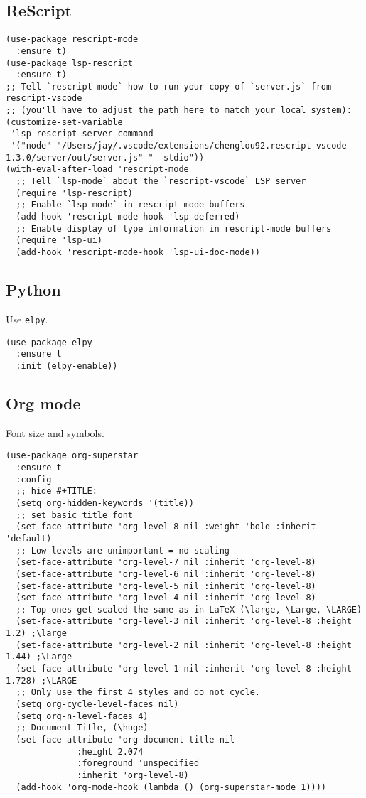 \documentclass[a4paper,11pt]{article}
\begin{document}
\subsection{ReScript}
\label{sec:org5b76676}
\begin{verbatim}
(use-package rescript-mode
  :ensure t)
(use-package lsp-rescript
  :ensure t)
;; Tell `rescript-mode` how to run your copy of `server.js` from rescript-vscode
;; (you'll have to adjust the path here to match your local system):
(customize-set-variable
 'lsp-rescript-server-command
 '("node" "/Users/jay/.vscode/extensions/chenglou92.rescript-vscode-1.3.0/server/out/server.js" "--stdio"))
(with-eval-after-load 'rescript-mode
  ;; Tell `lsp-mode` about the `rescript-vscode` LSP server
  (require 'lsp-rescript)
  ;; Enable `lsp-mode` in rescript-mode buffers
  (add-hook 'rescript-mode-hook 'lsp-deferred)
  ;; Enable display of type information in rescript-mode buffers
  (require 'lsp-ui)
  (add-hook 'rescript-mode-hook 'lsp-ui-doc-mode))
\end{verbatim}

\subsection{Python}
\label{sec:org11dc5ef}
Use \texttt{elpy}.
\begin{verbatim}
(use-package elpy
  :ensure t
  :init (elpy-enable))
\end{verbatim}

\subsection{Org mode}
\label{sec:orgc0129a2}
Font size and symbols.
\begin{verbatim}
(use-package org-superstar
  :ensure t
  :config
  ;; hide #+TITLE:
  (setq org-hidden-keywords '(title))
  ;; set basic title font
  (set-face-attribute 'org-level-8 nil :weight 'bold :inherit 'default)
  ;; Low levels are unimportant = no scaling
  (set-face-attribute 'org-level-7 nil :inherit 'org-level-8)
  (set-face-attribute 'org-level-6 nil :inherit 'org-level-8)
  (set-face-attribute 'org-level-5 nil :inherit 'org-level-8)
  (set-face-attribute 'org-level-4 nil :inherit 'org-level-8)
  ;; Top ones get scaled the same as in LaTeX (\large, \Large, \LARGE)
  (set-face-attribute 'org-level-3 nil :inherit 'org-level-8 :height 1.2) ;\large
  (set-face-attribute 'org-level-2 nil :inherit 'org-level-8 :height 1.44) ;\Large
  (set-face-attribute 'org-level-1 nil :inherit 'org-level-8 :height 1.728) ;\LARGE
  ;; Only use the first 4 styles and do not cycle.
  (setq org-cycle-level-faces nil)
  (setq org-n-level-faces 4)
  ;; Document Title, (\huge)
  (set-face-attribute 'org-document-title nil
		      :height 2.074
		      :foreground 'unspecified
		      :inherit 'org-level-8)
  (add-hook 'org-mode-hook (lambda () (org-superstar-mode 1))))
\end{verbatim}
\end{document}

